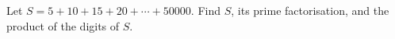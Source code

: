 Let $S=5+10+15+20+\cdots+50000$. Find $S$, its prime factorisation, and the product of the digits of $S$.
